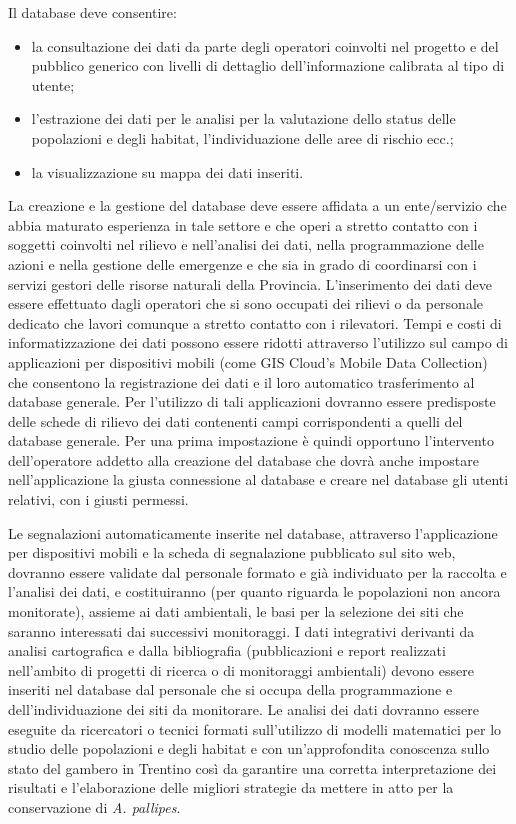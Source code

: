 \documentclass[11pt,a4paper,italian,twoside,openany]{memoir}
\begin{document}
Il database deve consentire:
\begin{itemize}
  \item la consultazione dei dati da parte degli operatori coinvolti nel progetto e del pubblico generico con livelli di dettaglio dell'informazione calibrata al tipo di utente;  
  \item l'estrazione dei dati per le analisi per la valutazione dello status delle popolazioni e degli habitat, l'individuazione delle aree di rischio ecc.; 
  \item la visualizzazione su mappa dei dati inseriti. 
\end{itemize}

La creazione e la gestione del database deve essere affidata a un ente/servizio che abbia maturato esperienza in tale settore e che operi a stretto contatto con i soggetti coinvolti nel rilievo e nell'analisi dei dati, nella programmazione delle azioni e nella gestione delle emergenze e che sia in grado di coordinarsi con i servizi gestori delle risorse naturali della Provincia. L'inserimento dei dati deve essere effettuato dagli operatori che si sono occupati dei rilievi o da personale dedicato che lavori comunque a stretto contatto con i rilevatori. Tempi e costi di informatizzazione dei dati possono essere ridotti attraverso l'utilizzo sul campo di applicazioni per dispositivi mobili (come GIS Cloud's Mobile Data Collection) che consentono la registrazione dei dati e il loro automatico trasferimento al database generale. Per l'utilizzo di tali applicazioni dovranno essere predisposte delle schede di rilievo dei dati contenenti campi corrispondenti a quelli del database generale. Per una prima impostazione è quindi opportuno l'intervento dell'operatore addetto alla creazione del database che dovrà anche impostare nell'applicazione la giusta connessione al database e creare nel database gli utenti relativi, con i giusti permessi. 

Le segnalazioni automaticamente inserite nel database, attraverso l'applicazione per dispositivi mobili e la scheda di segnalazione pubblicato sul sito web, dovranno essere validate dal personale formato e già individuato per la raccolta e l'analisi dei dati, e costituiranno (per quanto riguarda le popolazioni non ancora monitorate), assieme ai dati ambientali, le basi per la selezione dei siti che saranno interessati dai successivi monitoraggi. 
I dati integrativi derivanti da analisi cartografica e dalla bibliografia (pubblicazioni e report realizzati nell'ambito di progetti di ricerca o di monitoraggi ambientali) devono essere inseriti nel database dal personale che si occupa della programmazione e dell'individuazione dei siti da monitorare. Le analisi dei dati dovranno essere eseguite da ricercatori o tecnici formati sull'utilizzo di modelli matematici per lo studio delle popolazioni e degli habitat e con un'approfondita conoscenza sullo stato del gambero in Trentino così da garantire una corretta interpretazione dei risultati e l'elaborazione delle migliori strategie da mettere in atto per la conservazione di \emph{A. pallipes}. 
\end{document}
